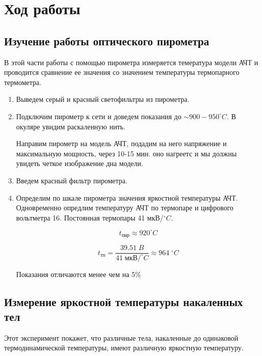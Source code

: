 \documentclass[a4paper]{article}
\begin{document}
\section{Ход работы}



\subsection{Изучение работы оптического пирометра}



В этой части работы с помощью пирометра измеряется темература модели АЧТ и проводится сравнение
ее значения со значением температуры термопарного термометра. 

\begin{enumerate}
    \item Выведем серый и красный светофильтры из пирометра.
    
    \item Подключим пирометр к сети и доведем показания до $\sim 900 - 950 ^{\circ} C$. В окуляре
    увидим раскаленную нить. \par
    Направим пирометр на модель АЧТ, подадим на него напряжение и максимальную мощность, через 10-15 мин. 
    оно нагреетс и мы должны увидеть четкое изображение дна модели. 

    \item Введем красный фильтр пирометра.

    \item Определим по шкале пирометра значения яркостной температуры АЧТ.  Одновременно опредлим 
    температуру АЧТ по термопаре  и цифрового вольтметра 16. Постоянная термопары 41 мкВ/$^{\circ} C$.

    $$t_{\text{пир}} \approx 920 ^{\circ} C$$

    $$t_{\text{тп}} = \frac{39.51\; B}{41 \; \text{мкВ/}^{\circ} C} \approx 964 \; ^{\circ} C$$

    Показания отличаются менее чем на 5\%
\end{enumerate}



\subsection{Измерение яркостной температуры накаленных тел}



Этот эксперимент покажет, что различные тела, накаленные до одинаковой термодинамической температуры,
имеют различную яркостную температуру.\par 
\end{document}
